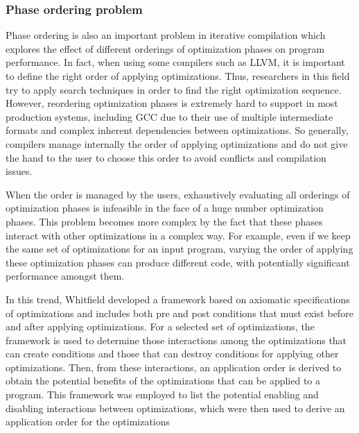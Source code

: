 \subsubsection{Phase ordering problem}
Phase ordering is also an important problem in iterative compilation which explores the effect of different orderings of optimization phases on program performance. In fact, when using some compilers such as LLVM, it is important to define the right order of applying optimizations. Thus, researchers in this field try to apply search techniques in order to find the right optimization sequence. However, reordering optimization phases is extremely hard to support in most production systems, including GCC due to their use of multiple intermediate formats and complex inherent dependencies between optimizations. So generally, compilers manage internally the order of applying optimizations and do not give the hand to the user to choose this order to avoid conflicts and compilation issues.

When the order is managed by the users, exhaustively evaluating  all orderings of optimization phases is infeasible in the face of a huge number optimization phases. This problem becomes more complex by the fact that these phases interact with other optimizations in a complex way.
For example, even if we keep the same set of optimizations for an input program, varying the order of applying these optimization phases can produce different code, with potentially significant performance  amongst them. 

In this trend, Whitfield\cite{whitfield1990approach} developed a framework based on axiomatic specifications of optimizations and includes both pre and post conditions that must exist before and after applying optimizations. For a selected set of optimizations, the framework is used to determine those interactions among the optimizations that can create conditions and those that can destroy conditions for applying other optimizations. Then, from these interactions, an application order is derived to obtain the potential benefits of the optimizations that can be applied to a program. 
This framework was employed to list the potential enabling and disabling interactions between optimizations, which were then used to derive an application
order for the optimizations

